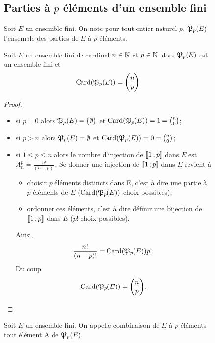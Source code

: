 \begin{figure}
\subsection{Parties à \(p\) éléments d'un ensemble fini}

Soit \(E\) un ensemble fini. On note pour tout entier naturel \(p\), \(\mathfrak{P}_p(E)\) l'ensemble des parties de \(E\) à \(p\) éléments.
\begin{prop}\label{prop:ppartiesfinies}
  Soit \(E\) un ensemble fini de cardinal \(n\in \mathbb{N}\) et \(p \in \mathbb{N}\) alors \(\mathfrak{P}_p(E)\) est un ensemble fini et
  \begin{equation}
    \operatorname{Card}(\mathfrak{P}_p(E))=\binom{n}{p}
  \end{equation}
\end{prop}
\begin{proof}
  \begin{itemize}
  \item si \(p=0\) alors \(\mathfrak{P}_p(E)=\{\emptyset\}\) et \(\operatorname{Card}(\mathfrak{P}_p(E))=1=\binom{n}{0}\);
  \item si \(p>n\) alors \(\mathfrak{P}_p(E)=\emptyset\) et \(\operatorname{Card}(\mathfrak{P}_p(E))=0=\binom{n}{0}\);
  \item si \(1\leqslant p \leqslant n\) alors le nombre d'injection de \(\mathopen{\llbracket}1\mathclose{}\mathpunct{};p\mathclose{\rrbracket}\) dans \(E\) est \(A_{n}^p=\frac{n!}{(n-p)!}\). Se donner une injection de  \(\mathopen{\llbracket}1\mathclose{}\mathpunct{};p\mathclose{\rrbracket}\) dans \(E\) revient à
    \begin{itemize}
    \item choisir \(p\) éléments distincts dans E, c'est à dire une partie à \(p\) éléments de \(E\) (\(\operatorname{Card}(\mathfrak{P}_p(E))\) choix possibles);
    \item ordonner ces éléments, c'est à dire définir une bijection de \(\mathopen{\llbracket}1\mathclose{}\mathpunct{};p\mathclose{\rrbracket}\) dans \(E\) (\(p!\) choix possibles).
    \end{itemize}
    Ainsi,
    \begin{equation}
      \frac{n!}{(n-p)!}=\operatorname{Card}(\mathfrak{P}_p(E)) p!.
    \end{equation}
    Du coup
    \begin{equation}
      \operatorname{Card}(\mathfrak{P}_p(E))=\binom{n}{p}.
    \end{equation}
  \end{itemize}
\end{proof}
\begin{defdef}
  Soit \(E\) un ensemble fini. On appelle combinaison de \(E\) à \(p\) éléments tout élément A de \(\mathfrak{P}_p(E)\).
\end{defdef}
\begin{prop}

\end{prop}
\end{figure}
